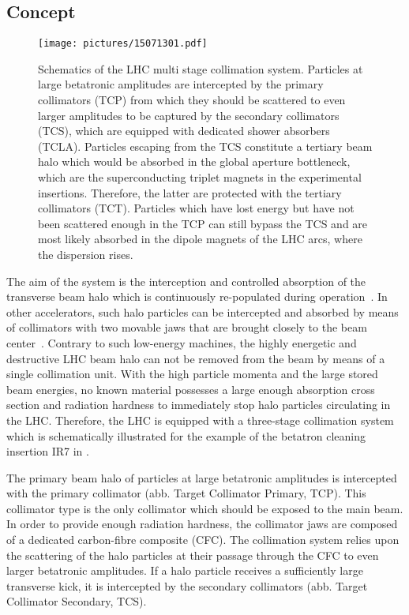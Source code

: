\subsection{Concept}
  \begin{figure}[t]
  \centering
  \texttt{[image: pictures/15071301.pdf]}
  \caption{Schematics of the LHC multi stage collimation system. Particles at large betatronic amplitudes are intercepted by the primary collimators (TCP) from which they should be scattered to even larger amplitudes to be captured by the secondary collimators (TCS), which are equipped with dedicated shower absorbers (TCLA). Particles escaping from the TCS constitute a tertiary beam halo which would be absorbed in the global aperture bottleneck, which are the superconducting triplet magnets in the experimental insertions. Therefore, the latter are protected with the tertiary collimators (TCT). Particles which have lost energy but have not been scattered enough in the TCP can still bypass the TCS and are most likely absorbed in the dipole magnets of the LHC arcs, where the dispersion rises.}  
  \label{pic:15071001}
  \end{figure}

The aim of the system is the interception and controlled absorption of the transverse beam halo which is continuously re-populated during operation~\cite{}. In other accelerators, such halo particles can be intercepted and absorbed by means of collimators with two movable jaws that are brought closely to the beam center~\cite{}. Contrary to such low-energy machines, the highly energetic and destructive LHC beam halo can not be removed from the beam by means of a single collimation unit. With the high particle momenta and the large stored beam energies, no known material possesses a large enough absorption cross section and radiation hardness to immediately stop halo particles circulating in the LHC. Therefore, the LHC is equipped with a three-stage collimation system which is schematically illustrated for the example of the betatron cleaning insertion IR7 in .

The primary beam halo of particles at large betatronic amplitudes is intercepted with the primary collimator (abb. Target   Collimator  Primary, TCP). This collimator type is the only collimator which should be exposed to the main beam. In order to provide enough radiation hardness, the collimator jaws are composed of a dedicated carbon-fibre composite (CFC). The collimation system relies upon the scattering of the halo particles at their passage through the CFC to even larger betatronic amplitudes. If a halo particle receives a sufficiently large transverse kick, it is intercepted by the secondary collimators (abb. Target Collimator Secondary, TCS). 


